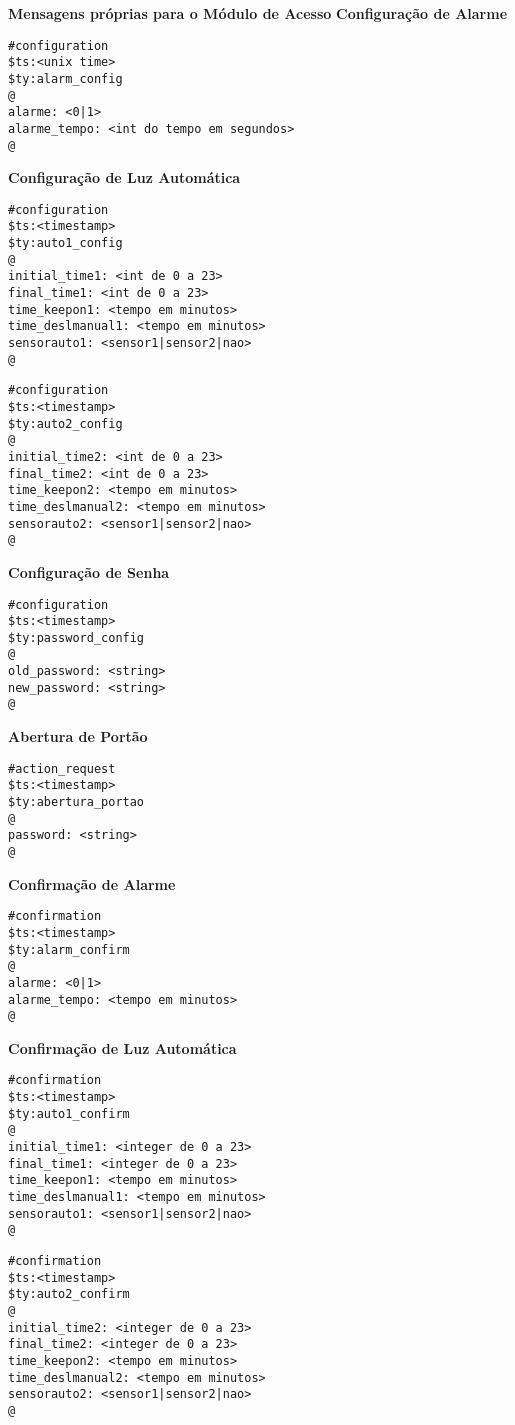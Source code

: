 \textbf{Mensagens próprias para o Módulo de Acesso}
\textbf{Configuração de Alarme}
\begin{lstlisting}
#configuration
$ts:<unix time>
$ty:alarm_config
@
alarme: <0|1>
alarme_tempo: <int do tempo em segundos>
@
\end{lstlisting}

\textbf{Configuração de Luz Automática}
\begin{lstlisting}
#configuration
$ts:<timestamp>
$ty:auto1_config
@
initial_time1: <int de 0 a 23>
final_time1: <int de 0 a 23>
time_keepon1: <tempo em minutos>
time_deslmanual1: <tempo em minutos>
sensorauto1: <sensor1|sensor2|nao>
@
\end{lstlisting}

\begin{lstlisting}
#configuration
$ts:<timestamp>
$ty:auto2_config
@
initial_time2: <int de 0 a 23>
final_time2: <int de 0 a 23>
time_keepon2: <tempo em minutos>
time_deslmanual2: <tempo em minutos>
sensorauto2: <sensor1|sensor2|nao>
@
\end{lstlisting}

\textbf{Configuração de Senha}
\begin{lstlisting}
#configuration
$ts:<timestamp>
$ty:password_config
@
old_password: <string>
new_password: <string>
@
\end{lstlisting}

\textbf{Abertura de Portão}
\begin{lstlisting}
#action_request
$ts:<timestamp>
$ty:abertura_portao
@
password: <string>
@
\end{lstlisting}

\textbf{Confirmação de Alarme}
\begin{lstlisting}
#confirmation
$ts:<timestamp>
$ty:alarm_confirm
@
alarme: <0|1>
alarme_tempo: <tempo em minutos>
@
\end{lstlisting}

\textbf{Confirmação de Luz Automática}
\begin{lstlisting}
#confirmation
$ts:<timestamp>
$ty:auto1_confirm
@
initial_time1: <integer de 0 a 23>
final_time1: <integer de 0 a 23>
time_keepon1: <tempo em minutos>
time_deslmanual1: <tempo em minutos>
sensorauto1: <sensor1|sensor2|nao>
@
\end{lstlisting}

\begin{lstlisting}
#confirmation
$ts:<timestamp>
$ty:auto2_confirm
@
initial_time2: <integer de 0 a 23>
final_time2: <integer de 0 a 23>
time_keepon2: <tempo em minutos>
time_deslmanual2: <tempo em minutos>
sensorauto2: <sensor1|sensor2|nao>
@
\end{lstlisting}

